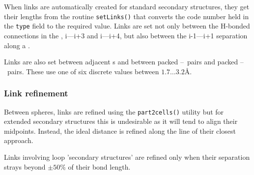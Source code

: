 When links are automatically created for standard secondary structures, they get their
lengths from the routine {\tt setLinks()} that converts the code number held in the {\tt type}
field to the required value.  Links are set not only between the H-bonded connections in the
\AH, i---i+3 and i---i+4, but also between the i-1---i+1 separation along a \Bs.

Links are also set between adjacent \Bs s and between packed \AH--\AH\ pairs and packed
\AH--\Bs\ pairs.   These use one of six discrete values between $1.7\ldots3.2$\AA.

\subsubsection{Link refinement}

Between spheres, links are refined using the {\tt part2cells()} utility but for extended
secondary structures this is undesirable as it will tend to align their midpoints.
Instead, the ideal distance is refined along the line of their closest approach.

Links involving loop 'secondary structures' are refined only when their separation
strays beyond $\pm 50$\% of their bond length. 



